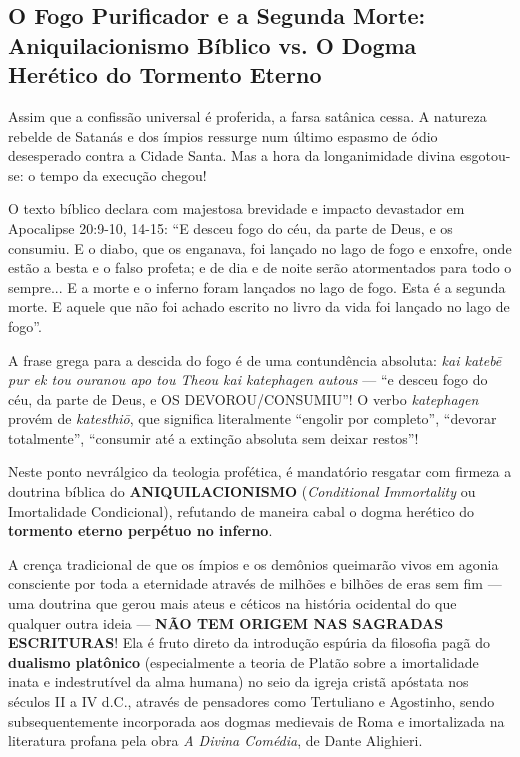 \documentclass[11pt,a4paper,openany]{book}
\begin{document}
\subsection{O Fogo Purificador e a Segunda Morte: Aniquilacionismo Bíblico vs. O Dogma Herético do Tormento Eterno}


Assim que a confissão universal é proferida, a farsa satânica cessa. A natureza rebelde de Satanás e dos ímpios ressurge num último espasmo de ódio desesperado contra a Cidade Santa. Mas a hora da longanimidade divina esgotou-se: o tempo da execução chegou!

O texto bíblico declara com majestosa brevidade e impacto devastador em Apocalipse 20:9-10, 14-15:
``E desceu fogo do céu, da parte de Deus, e os consumiu. E o diabo, que os enganava, foi lançado no lago de fogo e enxofre, onde estão a besta e o falso profeta; e de dia e de noite serão atormentados para todo o sempre... E a morte e o inferno foram lançados no lago de fogo. Esta é a segunda morte. E aquele que não foi achado escrito no livro da vida foi lançado no lago de fogo''.

A frase grega para a descida do fogo é de uma contundência absoluta: \textit{kai katebē pur ek tou ouranou apo tou Theou kai katephagen autous} — ``e desceu fogo do céu, da parte de Deus, e OS DEVOROU/CONSUMIU''! O verbo \textit{katephagen} provém de \textit{katesthiō}, que significa literalmente ``engolir por completo'', ``devorar totalmente'', ``consumir até a extinção absoluta sem deixar restos''!

Neste ponto nevrálgico da teologia profética, é mandatório resgatar com firmeza a doutrina bíblica do \textbf{ANIQUILACIONISMO} (\textit{Conditional Immortality} ou Imortalidade Condicional), refutando de maneira cabal o dogma herético do \textbf{tormento eterno perpétuo no inferno}.

A crença tradicional de que os ímpios e os demônios queimarão vivos em agonia consciente por toda a eternidade através de milhões e bilhões de eras sem fim — uma doutrina que gerou mais ateus e céticos na história ocidental do que qualquer outra ideia — \textbf{NÃO TEM ORIGEM NAS SAGRADAS ESCRITURAS}!
Ela é fruto direto da introdução espúria da filosofia pagã do \textbf{dualismo platônico} (especialmente a teoria de Platão sobre a imortalidade inata e indestrutível da alma humana) no seio da igreja cristã apóstata nos séculos II a IV d.C., através de pensadores como Tertuliano e Agostinho, sendo subsequentemente incorporada aos dogmas medievais de Roma e imortalizada na literatura profana pela obra \textit{A Divina Comédia}, de Dante Alighieri.
\end{document}

